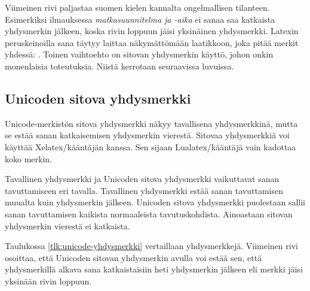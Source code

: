 Viimeinen rivi paljastaa suomen kielen kannalta ongelmallisen tilanteen.
Esimerkiksi ilmauksessa \emph{matkasuunnitelma ja \mbox{-aika}} ei sanaa
saa katkaista yhdysmerkin jälkeen, koska rivin loppuun jäisi yksinäinen
yhdysmerkki. Latexin peruskeinoilla sana täytyy laittaa näkymättömään
laatikkoon, joka pitää merkit yhdessä: .
Toinen vaihtoehto on sitovan yhdysmerkin käyttö, johon onkin monenlaisia
toteutuksia. Niistä kerrotaan seuraavissa luvuissa.

\subsection{Unicoden sitova yhdysmerkki}
\label{luku:unicode_sitova}

Unicode-merkistön sitova yhdysmerkki  näkyy tavallisena yhdysmerkkinä, mutta se estää sanan
katkaisemisen yhdysmerkin vierestä. Sitovaa yhdysmerkkiä voi käyttää
Xelatex\-/kääntäjän kanssa. Sen sijaan Lualatex\-/kääntäjä vain kadottaa
koko merkin.

Tavallinen yhdysmerkki  ja Unicoden
sitova yhdysmerkki  vaikuttavat sanan tavuttamiseen eri
tavalla. Tavallinen yhdysmerkki estää sanan tavuttamisen muualta kuin
yhdysmerkin jälkeen. Unicoden sitova yhdysmerkki puolestaan sallii sanan
tavuttamisen kaikista normaaleista tavutuskohdista. Ainoastaan sitovan
yhdysmerkin vierestä ei katkaista.


Taulukossa \ref{tlk:unicode-yhdysmerkki} vertaillaan yhdysmerkkejä.
Viimeinen rivi osoittaa, että Unicoden sitovan yhdysmerkin avulla voi
estää sen, että yhdysmerkillä alkava sana katkaistaisiin heti
yhdysmerkin jälkeen eli merkki jäisi yksinään rivin loppuun.

